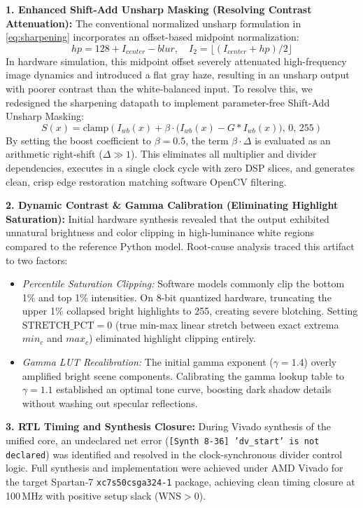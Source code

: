 \documentclass[10pt,twocolumn,letterpaper]{article}
\begin{document}
{\textbf{1. Enhanced Shift-Add Unsharp Masking (Resolving Contrast Attenuation):} 
The conventional normalized unsharp formulation in \cref{eq:sharpening} incorporates an offset-based midpoint normalization:
\begin{equation}
  hp = 128 + I_{center} - blur, \quad I_2 = \lfloor(I_{center} + hp) / 2\rfloor
\end{equation}
In hardware simulation, this midpoint offset severely attenuated high-frequency image dynamics and introduced a flat gray haze, resulting in an unsharp output with poorer contrast than the white-balanced input. To resolve this, we redesigned the sharpening datapath to implement parameter-free Shift-Add Unsharp Masking:
\begin{equation}
  S(x) = \text{clamp}\!\left(I_{wb}(x) + \beta \cdot \bigl(I_{wb}(x) - G * I_{wb}(x)\bigr),\, 0,\, 255\right)
  \label{eq:shift_add_unsharp}
\end{equation}
By setting the boost coefficient to $\beta = 0.5$, the term $\beta \cdot \Delta$ is evaluated as an arithmetic right-shift ($\Delta \gg 1$). This eliminates all multiplier and divider dependencies, executes in a single clock cycle with zero DSP slices, and generates clean, crisp edge restoration matching software OpenCV filtering.

\textbf{2. Dynamic Contrast \& Gamma Calibration (Eliminating Highlight Saturation):} 
Initial hardware synthesis revealed that the output exhibited unnatural brightness and color clipping in high-luminance white regions compared to the reference Python model. Root-cause analysis traced this artifact to two factors:
\begin{itemize}
    \item \emph{Percentile Saturation Clipping:} Software models commonly clip the bottom 1\% and top 1\% intensities. On 8-bit quantized hardware, truncating the upper 1\% collapsed bright highlights to 255, creating severe blotching. Setting $\text{STRETCH\_PCT} = 0$ (true min-max linear stretch between exact extrema $min_c$ and $max_c$) eliminated highlight clipping entirely.
    \item \emph{Gamma LUT Recalibration:} The initial gamma exponent ($\gamma = 1.4$) overly amplified bright scene components. Calibrating the gamma lookup table to $\gamma = 1.1$ established an optimal tone curve, boosting dark shadow details without washing out specular reflections.
\end{itemize}

\textbf{3. RTL Timing and Synthesis Closure:} 
During Vivado synthesis of the unified core, an undeclared net error (\texttt{[Synth 8-36] 'dv\_start' is not declared}) was identified and resolved in the clock-synchronous divider control logic. Full synthesis and implementation were achieved under AMD Vivado for the target Spartan-7 \texttt{xc7s50csga324-1} package, achieving clean timing closure at 100\,MHz with positive setup slack ($\text{WNS} > 0$).

}
\end{document}
